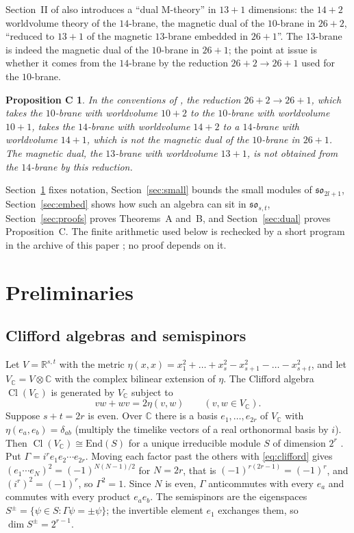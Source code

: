 \documentclass[11pt]{amsart}
\newtheorem*{propositionC}{Proposition C}
\theoremstyle{remark}
\newcommand{\so}{\mathfrak{so}}
\newcommand{\R}{\mathbb{R}}
\newcommand{\C}{\mathbb{C}}
\DeclareMathOperator{\Cl}{Cl}
\begin{document}
Section~II of \cite{RMC20} also introduces a ``dual M-theory'' in $13+1$ dimensions: the $14+2$ worldvolume theory of the $14$-brane, the magnetic dual of the $10$-brane in $26+2$, ``reduced to $13+1$ of the magnetic $13$-brane embedded in $26+1$''. The $13$-brane is indeed the magnetic dual of the $10$-brane in $26+1$; the point at issue is whether it comes from the $14$-brane by the reduction $26+2\to26+1$ used for the $10$-brane.

\begin{propositionC}
In the conventions of \cite{RMC20}, the reduction $26+2\to 26+1$, which takes the $10$-brane with worldvolume $10+2$ to the $10$-brane with worldvolume $10+1$, takes the $14$-brane with worldvolume $14+2$ to a $14$-brane with worldvolume $14+1$, which is not the magnetic dual of the $10$-brane in $26+1$. The magnetic dual, the $13$-brane with worldvolume $13+1$, is not obtained from the $14$-brane by this reduction.
\end{propositionC}

Section~\ref{sec:prelim} fixes notation, Section~\ref{sec:small} bounds the small modules of $\so_{2l+1}$, Section~\ref{sec:embed} shows how such an algebra can sit in $\so_{s,t}$, Section~\ref{sec:proofs} proves Theorems~A and~B, and Section~\ref{sec:dual} proves Proposition~C. The finite arithmetic used below is rechecked by a short program in the archive of this paper \cite{Arch}; no proof depends on it.

\section{Preliminaries}\label{sec:prelim}

\subsection{Clifford algebras and semispinors}
Let $V=\R^{s,t}$ with the metric $\eta(x,x)=x_1^2+\dots+x_s^2-x_{s+1}^2-\dots-x_{s+t}^2$, and let $V_\C=V\otimes\C$ with the complex bilinear extension of $\eta$. The Clifford algebra $\Cl(V_\C)$ is generated by $V_\C$ subject to
\begin{equation}\label{eq:clifford}
vw+wv=2\eta(v,w)\qquad(v,w\in V_\C).
\end{equation}
Suppose $s+t=2r$ is even. Over $\C$ there is a basis $e_1,\dots,e_{2r}$ of $V_\C$ with $\eta(e_a,e_b)=\delta_{ab}$ (multiply the timelike vectors of a real orthonormal basis by $i$). Then $\Cl(V_\C)\cong\mathrm{End}(S)$ for a unique irreducible module $S$ of dimension $2^r$ \cite[Ch.~I, \S\S 4--5]{LM89}. Put $\Gamma=i^re_1e_2\cdots e_{2r}$. Moving each factor past the others with \eqref{eq:clifford} gives $(e_1\cdots e_{N})^2=(-1)^{N(N-1)/2}$ for $N=2r$, that is $(-1)^{r(2r-1)}=(-1)^r$, and $(i^r)^2=(-1)^r$, so $\Gamma^2=1$. Since $N$ is even, $\Gamma$ anticommutes with every $e_a$ and commutes with every product $e_ae_b$. The semispinors are the eigenspaces $S^\pm=\{\psi\in S:\Gamma\psi=\pm\psi\}$; the invertible element $e_1$ exchanges them, so $\dim S^\pm=2^{r-1}$.
\end{document}

